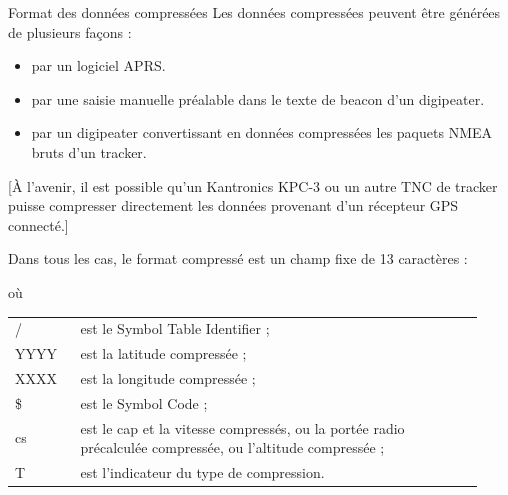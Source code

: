 \begin{aprssideblock}{Format des données compressées}
Les données compressées peuvent être générées de plusieurs façons :

\begin{itemize}
\setlength{\itemsep}{0.25em}
\setlength{\parskip}{0pt}
\item par un logiciel APRS.
\item par une saisie manuelle préalable dans le texte de beacon d'un
  digipeater.
\item par un digipeater convertissant en données compressées les paquets NMEA
  bruts d'un tracker.
\end{itemize}

[À l'avenir, il est possible qu'un Kantronics KPC-3 ou un autre TNC de tracker
puisse compresser directement les données provenant d'un récepteur GPS
connecté.]

Dans tous les cas, le format compressé est un champ fixe de 13 caractères :

\par\medskip
\noindent\hspace*{0.7em}
\par\medskip

où

\begin{tabular}{@{}>{\ttfamily}p{0.13\linewidth}@{}>{\raggedright\arraybackslash}p{0.80\linewidth}@{}}
/    & est le Symbol Table Identifier ; \\
YYYY & est la latitude compressée ; \\
XXXX & est la longitude compressée ; \\
\$   & est le Symbol Code ; \\
cs   & est le cap et la vitesse compressés, ou la portée radio précalculée
       compressée, ou l'altitude compressée ; \\
T    & est l'indicateur du type de compression.
\end{tabular}


\end{aprssideblock}
